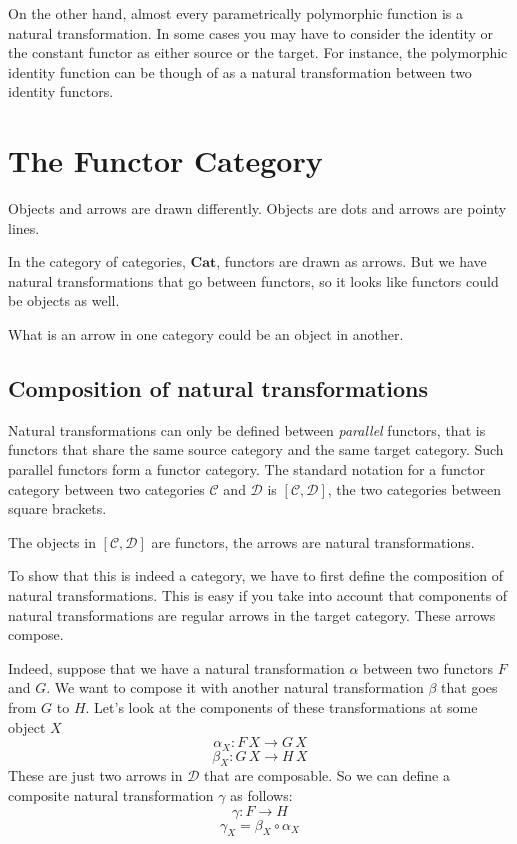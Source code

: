 \documentclass[DaoFP]{subfiles}
\begin{document}
On the other hand, almost every parametrically polymorphic function is a natural transformation. In some cases you may have to consider the identity or the constant functor as either source or the target. For instance, the polymorphic identity function can be though of as a natural transformation between two identity functors.

\section{The Functor Category}

Objects and arrows are drawn differently. Objects are dots and arrows are pointy lines.

In the category of categories, $\mathbf{Cat}$, functors are drawn as arrows. But we have natural transformations that go between functors, so it looks like functors could be objects as well. 

What is an arrow in one category could be an object in another.

\subsection{Composition of natural transformations}

Natural transformations can only be defined between \emph{parallel} functors, that is functors that share the same source category and the same target category. Such parallel functors form a functor category. The standard notation for a functor category between two categories $\mathcal{C}$ and $\mathcal{D}$ is $[\mathcal{C}, \mathcal{D}]$, the two categories between square brackets.

The objects in $[\mathcal{C}, \mathcal{D}]$ are functors, the arrows are natural transformations. 

To show that this is indeed a category, we have to first define the composition of natural transformations. This is easy if you take into account that components of natural transformations are regular arrows in the target category. These arrows compose.

Indeed, suppose that we have a natural transformation $\alpha$ between two functors $F$ and $G$. We want to compose it with another natural transformation $\beta$ that goes from $G$ to $H$. Let's look at the components of these transformations at some object $X$
\[ \alpha_X \colon F \, X \to G \, X \]
\[ \beta_X \colon G \, X \to H \, X \]
These are just two arrows in $\mathcal{D}$ that are composable. So we can define a composite natural transformation $\gamma$ as follows:
\[ \gamma \colon F \to H\]
\[ \gamma_X = \beta_X \circ \alpha_X \]
\end{document}
